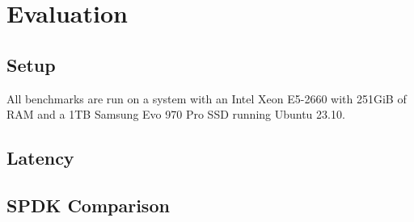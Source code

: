 \chapter{Evaluation}

\section{Setup}
All benchmarks are run on a system with an Intel Xeon E5-2660 with 251GiB of RAM and a 1TB Samsung Evo 970 Pro SSD running Ubuntu 23.10.

\section{Latency}

\section{SPDK Comparison}
